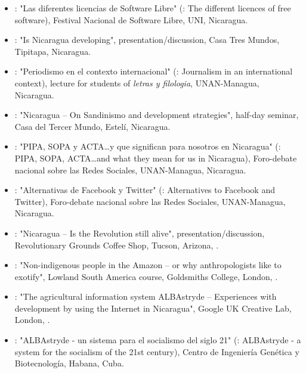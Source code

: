 \begin{itemize}
\item {}: "Las diferentes licencias de Software Libre" (\english: The different licences of free software), Festival Nacional de Software Libre, UNI, Nicaragua.

\item {}: "Is Nicaragua developing", presentation/discussion, Casa Tres Mundos, Tipitapa, Nicaragua.

\item {}: "Periodismo en el contexto internacional" (\english: Journalism in an international context), lecture for students of \emph{letras y filologia}, UNAN-Managua, Nicaragua.

\item {}: "Nicaragua – On Sandinismo and development strategies", half-day seminar, Casa del Tercer Mundo, Estelí, Nicaragua.

\item {}: "PIPA, SOPA y ACTA\ldots y que significan para nosotros en Nicaragua" (\english: PIPA, SOPA, ACTA\ldots and what they mean for us in Nicaragua), Foro-debate nacional sobre las Redes Sociales, UNAN-Managua, Nicaragua.

\item {}: "Alternativas de Facebook y Twitter" (\english: Alternatives to Facebook and Twitter), Foro-debate nacional sobre las Redes Sociales, UNAN-Managua, Nicaragua.

\item {}: "Nicaragua – Is the Revolution still alive", presentation/discussion, Revolutionary Grounds Coffee Shop, Tucson, Arizona, \USA.

\item {}: "Non-indigenous people in the Amazon – or why anthropologists like to exotify", Lowland South America course, Goldsmiths College, London, \UK.

\item {}: "The agricultural information system ALBAstryde – Experiences with development by using the Internet in Nicaragua", Google UK Creative Lab, London, \UK.

\item {}: "ALBAstryde - un sistema para el socialismo del siglo 21" (\english: ALBAstryde - a system for the socialism of the 21st century), Centro de Ingeniería Genética y Biotecnología, Habana, Cuba.


\end{itemize}
